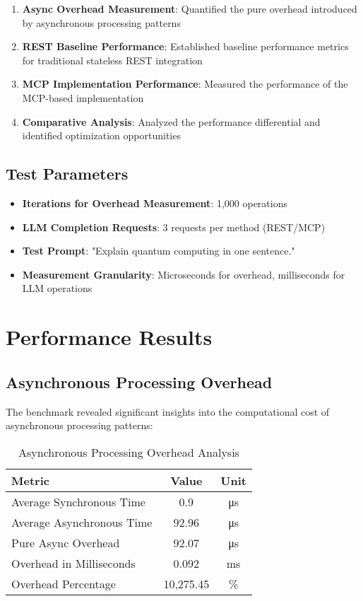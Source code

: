 \begin{enumerate}
    \item \textbf{Async Overhead Measurement}: Quantified the pure overhead introduced by asynchronous processing patterns
    \item \textbf{REST Baseline Performance}: Established baseline performance metrics for traditional stateless REST integration
    \item \textbf{MCP Implementation Performance}: Measured the performance of the MCP-based implementation
    \item \textbf{Comparative Analysis}: Analyzed the performance differential and identified optimization opportunities
\end{enumerate}

\subsection{Test Parameters}

\begin{itemize}
    \item \textbf{Iterations for Overhead Measurement}: 1,000 operations
    \item \textbf{LLM Completion Requests}: 3 requests per method (REST/MCP)
    \item \textbf{Test Prompt}: "Explain quantum computing in one sentence."
    \item \textbf{Measurement Granularity}: Microseconds for overhead, milliseconds for LLM operations
\end{itemize}

\section{Performance Results}

\subsection{Asynchronous Processing Overhead}

The benchmark revealed significant insights into the computational cost of asynchronous processing patterns:

\begin{table}[h]
\centering
\caption{Asynchronous Processing Overhead Analysis}
\begin{tabular}{|l|c|c|}
\hline
\textbf{Metric} & \textbf{Value} & \textbf{Unit} \\
\hline
Average Synchronous Time & 0.9 & μs \\
\hline
Average Asynchronous Time & 92.96 & μs \\
\hline
Pure Async Overhead & 92.07 & μs \\
\hline
Overhead in Milliseconds & 0.092 & ms \\
\hline
Overhead Percentage & 10,275.45 & \% \\
\hline
\end{tabular}
\end{table}

